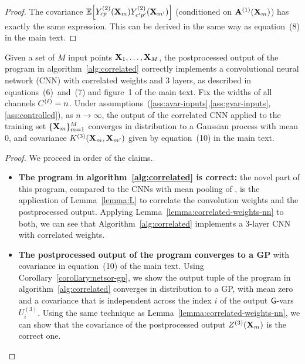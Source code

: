 {{\begin{proof}
  The covariance $\ExpSymb\sqb{Y_{cp}^{(2)}(\vX_m)Y_{c' p'}^{(2)}(\vX_{m'})}$
  (conditioned on $\mathbf{A}^{(1)}(\mathbf{X}_m)$)
  has exactly the same expression. This can be derived in the same way as
  equation~(8) in the main text.
\end{proof}


\begin{theorem}
  Given a set of $M$ input points $\mathbf{X}_1,\dots,\mathbf{X}_M$,
  the postprocessed output of the \Netsor program in algorithm~\ref{alg:correlated} correctly implements a
  convolutional neural network (CNN) with correlated weights and 3 layers, as described in
  equations~(6)~and~(7) and figure~1 of the main text. Fix the widths of all channels
  $C^{(\ell)} = n$.
  Under assumptions~(\ref{ass:avar-inputs},\ref{ass:gvar-inputs},\ref{ass:controlled}),
  as $n \to \infty$, the output of the correlated CNN
  applied to the training set $\{\mathbf{X}_m\}_{m=1}^M$ converges in distribution to a
  Gaussian process with mean 0, and covariance $K^{(3)}(\mathbf{X}_{m}, \mathbf{X}_{m'})$
  given by equation~(10) in the main text.
\label{theorem:correlated-weights-nn}
\end{theorem}
\begin{proof}
We proceed in order of the claims.
\begin{itemize}
  \item\textbf{The program in algorithm~\ref{alg:correlated} is correct:}
  the novel part of this program, compared to the CNNs with mean pooling of
  \citet[appendix~B.2]{yang2019wide}, is the application of Lemma~\ref{lemma:L}
  to correlate the convolution weights and the postprocessed output. Applying
  Lemma~\ref{lemma:correlated-weights-nn} to both, we can see that
  Algorithm~\ref{alg:correlated} implements a 3-layer CNN with correlated weights.

  \item\textbf{The postprocessed output of the program converges to a GP} with
      covariance in equation~(10) of the main text. Using
      Corollary~\ref{corollary:netsor-gp}, we show the output tuple of the
      \Netsor program in algorithm~\ref{alg:correlated} converges in
      distribution to a GP, with mean zero and a covariance that is independent across the
      index $i$ of the output $\mathsf{G}$-vars $U_i^{(3)}$. Using the same technique
      as Lemma~\ref{lemma:correlated-weights-nn}, we can show that the
      covariance of the postprocessed output $Z^{(3)}(\mathbf{X}_m)$ is the correct one.


\end{itemize}
\end{proof}}}
